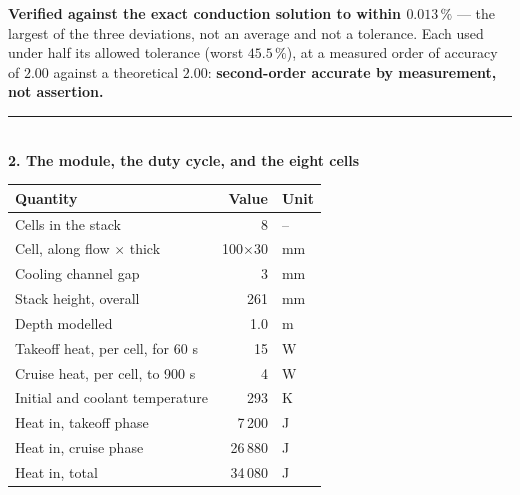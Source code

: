 \documentclass[9pt,a4paper]{article}
\renewcommand{\footnotesize}{\fontsize{6.9}{7.5}\selectfont}
\begin{document}
\vspace{1.5pt}
{\footnotesize\textbf{Verified against the exact conduction solution to within
$0.013\,\%$} --- the largest of the three deviations, not an average and not a
tolerance. Each used under half its allowed tolerance (worst $45.5\,\%$), at a
measured order of accuracy of $2.00$ against a theoretical $2.00$:
\textbf{second-order accurate by measurement, not assertion.}}

\vspace{1.5pt}
{\color{rulegrey}\rule{\textwidth}{0.5pt}}\\[1pt]
\textbf{2. The module, the duty cycle, and the eight cells}

\vspace{1.5pt}
\begin{minipage}[t]{0.35\textwidth}
{\fontsize{6.8}{7.8}\selectfont
\begin{tabular}{l r l}
\toprule
Quantity & Value & Unit \\
\midrule
Cells in the stack                  & 8      & -- \\
Cell, along flow $\times$ thick     & 100$\times$30 & mm \\
Cooling channel gap                 & 3      & mm \\
Stack height, overall               & 261    & mm \\
Depth modelled                      & 1.0    & m \\
\midrule
Takeoff heat, per cell, for 60 s    & 15     & W \\
Cruise heat, per cell, to 900 s     & 4      & W \\
Initial and coolant temperature     & 293    & K \\
\midrule
Heat in, takeoff phase              & 7\,200  & J \\
Heat in, cruise phase               & 26\,880 & J \\
Heat in, total                      & 34\,080 & J \\
\bottomrule
\end{tabular}}
\end{minipage}\hfill
\end{document}

